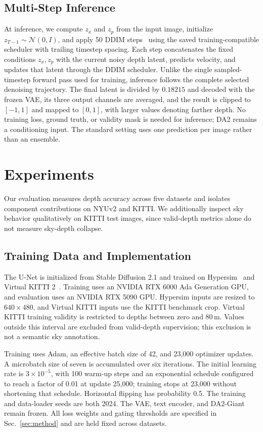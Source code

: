 \documentclass[10pt,journal,a4paper]{IEEEtran}
\begin{document}
\subsection{Multi-Step Inference}
\label{sec:inference}
At inference, we compute $z_x$ and $z_p$ from the input image, initialize $z_{T-1}\sim\mathcal N(0,I)$, and apply 50 DDIM steps~\cite{song2020denoising} using the saved training-compatible scheduler with trailing timestep spacing. Each step concatenates the fixed conditions $z_x,z_p$ with the current noisy depth latent, predicts velocity, and updates that latent through the DDIM scheduler. Unlike the single sampled-timestep forward pass used for training, inference follows the complete selected denoising trajectory. The final latent is divided by $0.18215$ and decoded with the frozen VAE, its three output channels are averaged, and the result is clipped to $[-1,1]$ and mapped to $[0,1]$, with larger values denoting farther depth. No training loss, ground truth, or validity mask is needed for inference; DA2 remains a conditioning input. The standard setting uses one prediction per image rather than an ensemble.

\section{Experiments}
\label{sec:experiments}
Our evaluation measures depth accuracy across five datasets and isolates component contributions on NYUv2 and KITTI. We additionally inspect sky behavior qualitatively on KITTI test images, since valid-depth metrics alone do not measure sky-depth collapse.

\subsection{Training Data and Implementation}
\label{sec:implementation}
The U-Net is initialized from Stable Diffusion 2.1 and trained on Hypersim~\cite{roberts2021hypersim} and Virtual KITTI 2~\cite{cabon2020virtual}. Training uses an NVIDIA RTX 6000 Ada Generation GPU, and evaluation uses an NVIDIA RTX 5090 GPU. Hypersim inputs are resized to $640\times480$, and Virtual KITTI inputs use the KITTI benchmark crop. Virtual KITTI training validity is restricted to depths between zero and 80\,m. Values outside this interval are excluded from valid-depth supervision; this exclusion is not a semantic sky annotation.

Training uses Adam, an effective batch size of 42, and 23,000 optimizer updates. A microbatch size of seven is accumulated over six iterations. The initial learning rate is $3\times10^{-5}$, with 100 warm-up steps and an exponential schedule configured to reach a factor of 0.01 at update 25,000; training stops at 23,000 without shortening that schedule. Horizontal flipping has probability 0.5. The training and data-loader seeds are both 2024. The VAE, text encoder, and DA2-Giant remain frozen. All loss weights and gating thresholds are specified in Sec.~\ref{sec:method} and are held fixed across datasets.
\end{document}
